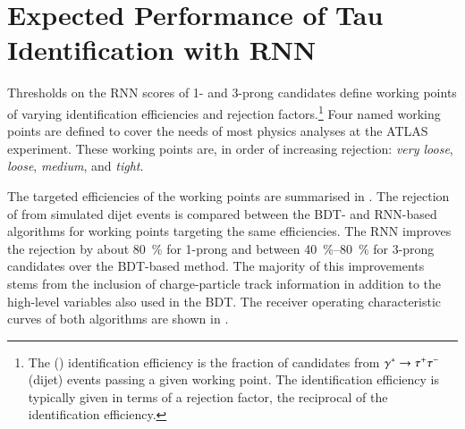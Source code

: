 \section{Expected Performance of Tau Identification with RNN}%
\label{sec:tauid_perf}

Thresholds on the RNN scores of 1- and 3-prong \tauhadvis candidates
define working points of varying \tauhadvis identification
efficiencies and \faketauhadvis rejection factors.\footnote{The
  \truetauhadvis (\faketauhadvis) identification efficiency is the
  fraction of \tauhadvis candidates from $\gammastar \to \tautau$
  (dijet) events passing a given working point. The \faketauhadvis
  identification efficiency is typically given in terms of a rejection
  factor, the reciprocal of the identification efficiency.} Four named
working points are defined to cover the needs of most physics analyses
at the ATLAS experiment. These working points are, in order of
increasing \faketauhadvis rejection: \emph{very loose}, \emph{loose},
\emph{medium}, and \emph{tight}.

The targeted \truetauhadvis efficiencies of the working points are
summarised in . The rejection of \faketauhadvis from
simulated dijet events is compared between the BDT- and RNN-based
\tauid algorithms for working points targeting the same \truetauhadvis
efficiencies. The RNN \tauid improves the \faketauhadvis rejection by
about \SI{80}{\percent} for 1-prong and between
\SIrange{40}{80}{\percent} for 3-prong \tauhadvis candidates over the
BDT-based method. The majority of this improvements stems from the
inclusion of charge-particle track information in addition to the
high-level variables also used in the BDT. The receiver operating
characteristic curves of both algorithms are shown in
.

\begin{table}[htbp]
  \centering

  \caption{Summary of working points defined for the BDT and RNN-based
    \tauid. Only the targeted \truetauhadvis efficiency (target
    \truetauhadvis eff.) of the working points is given which can
    deviate by ca.\ \SI{1}{\percent} from the actual efficiency
    observed in simulated $\gammastar \to \tautau$ events. The
    \faketauhadvis rejection is evaluated using the \tauhadvis
    candidate sample from dijet events. The table is adapted from
    Ref.~\cite{ATL-PHYS-PUB-2019-033}.}%
  \label{tab:rnn_wps}

  
\end{table}

